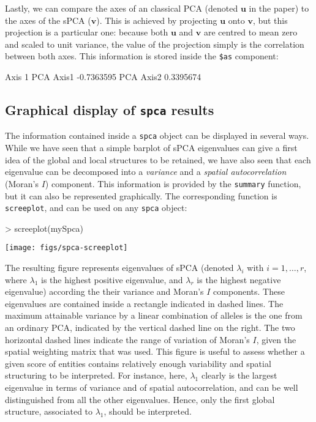 \documentclass{article}
\newcommand{\m}[1]{\mathbf{#1}}
\begin{document}
\noindent Lastly, we can compare the axes of an classical
PCA (denoted $\m{u}$ in the paper) to the axes of the sPCA ($\m{v}$).
This is achieved by projecting $\m{u}$ onto $\m{v}$, but this
projection is a particular one: because both $\m{u}$ and $\m{v}$ are
centred to mean zero and scaled to unit variance, the value of the
projection simply is the correlation between both axes.
This information is stored inside the \texttt{\$as} component:
\begin{Schunk}
\begin{Soutput}
              Axis 1
PCA Axis1 -0.7363595
PCA Axis2  0.3395674
\end{Soutput}
\end{Schunk}





\subsection{Graphical display of \texttt{spca} results}

The information contained inside a \texttt{spca} object can be displayed
in several ways.
While we have seen that a simple barplot of sPCA eigenvalues can give a first idea of the
global and local structures to be retained, we have also seen that
each eigenvalue can be decomposed into a \textit{variance} and a
\textit{spatial autocorrelation} (Moran's $I$) component.
This information is provided by the \texttt{summary} function, but it
can also be represented graphically.
The corresponding function is \texttt{screeplot}, and can be used on any
\texttt{spca} object:
\begin{Schunk}
\begin{Sinput}
> screeplot(mySpca)
\end{Sinput}
\end{Schunk}
\texttt{[image: figs/spca-screeplot]}

\noindent The resulting figure represents eigenvalues of sPCA (denoted
$\lambda_i$ with $i=1,\ldots,r$, where $\lambda_1$ is the highest
positive eigenvalue, and $\lambda_{r}$ is the highest negative
eigenvalue) according the their variance and Moran's $I$ components.
These eigenvalues are contained inside a rectangle indicated in dashed
lines.
The maximum attainable variance by a linear combination of alleles is
the one from an ordinary PCA, indicated by the vertical dashed line on
the right.
The two horizontal dashed lines indicate the range of variation of
Moran's $I$, given the spatial weighting matrix that was used.
This figure is useful to assess whether a given score of entities contains
relatively enough variability and spatial structuring to be interpreted.
For instance, here, $\lambda_1$ clearly is the largest eigenvalue in
terms of variance and of spatial autocorrelation, and can be well
distinguished from all the other eigenvalues.
Hence, only the first global structure, associated to $\lambda_1$, should be interpreted.
\\
\end{document}
